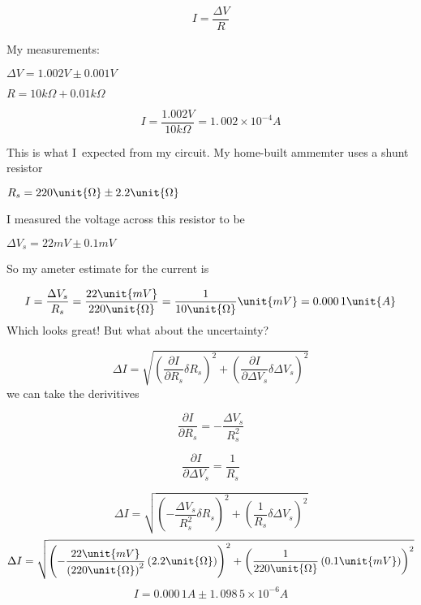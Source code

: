 \documentclass{article}
\begin{document}
\[
I=\frac{\Delta V}{R}
\]

My measurements:

$\Delta V=1.002\unit{V}\pm 0.001\unit{V}$

$R=10\unit{k%
\Omega%
}+0.01\unit{k%
\Omega%
}$

\[
I=\frac{1.002\unit{V}}{10\unit{k%
\Omega%
}}=\allowbreak 1.\,\allowbreak 002\times 10^{-4}\unit{A}
\]

This is what I\ expected from my circuit. My home-built ammemter uses a
shunt resistor

$R_{s}=220\unit{%
\Omega%
}\pm 2.2\unit{%
\Omega%
}$

\bigskip 

I measured the voltage across this resistor to be 

$\Delta V_{s}=22\unit{mV}\pm 0.1\unit{mV}$

So my ameter estimate for the current is 

\[
I=\frac{\Delta V_{s}}{R_{s}}=\frac{22\unit{mV}}{220\unit{%
\Omega%
}}=\allowbreak \frac{1}{10\unit{%
\Omega%
}}\unit{mV}=\allowbreak 0.000\,1\unit{A}
\]
Which looks great! But what about the uncertainty?

\[
\Delta I=\sqrt{\left( \frac{\partial I}{\partial R_{s}}\delta R_{s}\right)
^{2}+\left( \frac{\partial I}{\partial \Delta V_{s}}\delta \Delta
V_{s}\right) ^{2}}
\]%
we can take the derivitives

\[
\frac{\partial I}{\partial R_{s}}=-\frac{\Delta V_{s}}{R_{s}^{2}}
\]

\[
\frac{\partial I}{\partial \Delta V_{s}}=\frac{1}{R_{s}}
\]

\[
\Delta I=\sqrt{\left( -\frac{\Delta V_{s}}{R_{s}^{2}}\delta R_{s}\right)
^{2}+\left( \frac{1}{R_{s}}\delta \Delta V_{s}\right) ^{2}}
\]%
\[
\Delta I=\sqrt{\left( -\frac{22\unit{mV}}{\left( 220\unit{%
\Omega%
}\right) ^{2}}\left( 2.2\unit{%
\Omega%
}\right) \right) ^{2}+\left( \frac{1}{220\unit{%
\Omega%
}}\left( 0.1\unit{mV}\right) \right) ^{2}}
\]
\[
I=\allowbreak 0.000\,1\unit{A}\pm 1.\,\allowbreak 098\,5\times 10^{-6}\unit{A%
}
\]
\end{document}
